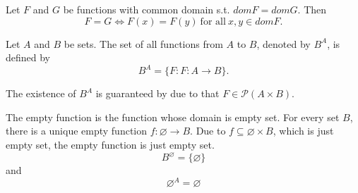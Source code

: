 \begin{theorem}{}{}
    Let $F$ and $G$ be functions with common domain s.t. $domF = domG$. Then
    \[
        F = G \iff F(x) = F(y) \ \text{for all}\ x, y \in domF.
    \]
\end{theorem}

\begin{definition}{}{}
Let $A$ and $B$ be sets. The set of all functions from $A$ to $B$, denoted by $B^A$, is defined by
\[
B^A = \{ F : F : A \to B \}.
\]
\end{definition}

\begin{remarks}
    The existence of $B^{A}$ is guaranteed by  due to that $F \in \mathcal{P}(A \times B) $.
\end{remarks}

\begin{examples}
    The empty function is the function whose domain is empty set. For every set $B$, there is a unique empty function $f: \varnothing \to B$. Due to $f \subseteq \varnothing \times B$, which is just empty set,  the empty function is just empty set.
    \[
        B^{\varnothing} = \{\varnothing\}
    \]
    and 
    \[
        \varnothing^A = \varnothing
    \]
\end{examples}

